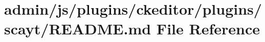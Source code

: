 \hypertarget{admin_2js_2plugins_2ckeditor_2plugins_2scayt_2_r_e_a_d_m_e_8md}{\section{admin/js/plugins/ckeditor/plugins/scayt/\-R\-E\-A\-D\-M\-E.md File Reference}
\label{admin_2js_2plugins_2ckeditor_2plugins_2scayt_2_r_e_a_d_m_e_8md}
}
